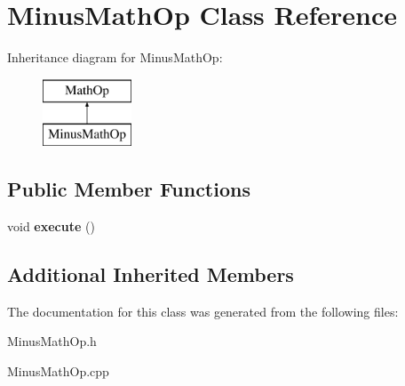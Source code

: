\hypertarget{class_minus_math_op}{}\section{Minus\+Math\+Op Class Reference}
\label{class_minus_math_op}
Inheritance diagram for Minus\+Math\+Op\+:\begin{figure}[H]
\begin{center}
\leavevmode
\includegraphics[height=2.000000cm]{class_minus_math_op}
\end{center}
\end{figure}
\subsection*{Public Member Functions}
\begin{DoxyCompactItemize}
\item 
\hypertarget{class_minus_math_op_a996c6bc342830c935e02c0752feb3500}{}void {\bfseries execute} ()\label{class_minus_math_op_a996c6bc342830c935e02c0752feb3500}

\end{DoxyCompactItemize}
\subsection*{Additional Inherited Members}


The documentation for this class was generated from the following files\+:\begin{DoxyCompactItemize}
\item 
Minus\+Math\+Op.\+h\item 
Minus\+Math\+Op.\+cpp\end{DoxyCompactItemize}
